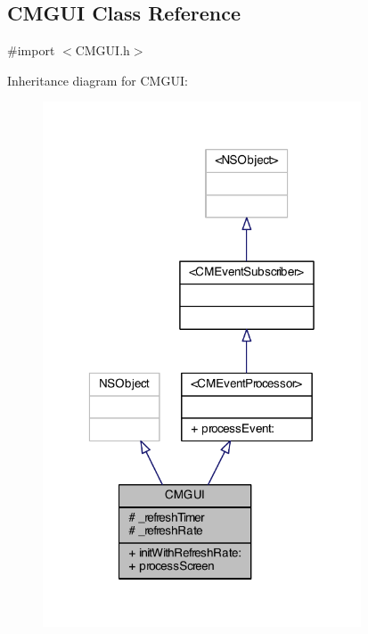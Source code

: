 \subsection{C\-M\-G\-U\-I Class Reference}
\label{interface_c_m_g_u_i}


{\ttfamily \#import $<$C\-M\-G\-U\-I.\-h$>$}



Inheritance diagram for C\-M\-G\-U\-I\-:
\nopagebreak
\begin{figure}[H]
\begin{center}
\leavevmode
\includegraphics[width=268pt]{interface_c_m_g_u_i__inherit__graph}
\end{center}
\end{figure}


